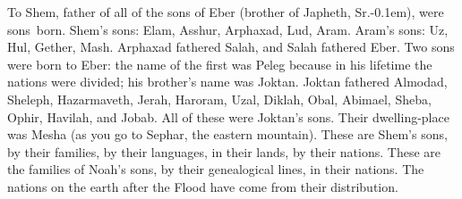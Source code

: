 \begin{inparaenum}
     To Shem, father of all of the sons of Eber (brother of Japheth, Sr.\kern-0.1em), were sons\understood\ born.%
     Shem's sons: Elam, Asshur, Arphaxad, Lud, Aram.%
     Aram's sons: Uz, Hul, Gether, Mash.%
     Arphaxad fathered Salah, and Salah fathered Eber.%
     Two sons were born to Eber: the name of the first was Peleg because in his lifetime the nations were divided; his brother's name was Joktan.%
     Joktan fathered Almodad, Sheleph, Hazarmaveth, Jerah,%
     Haroram, Uzal, Diklah,%
     Obal, Abimael, Sheba,%
     Ophir, Havilah, and Jobab. All of these were Joktan's sons.%
     Their dwelling-place was Mesha (as you go to Sephar, the eastern mountain).%
     These are Shem's sons, by their families, by their languages, in their lands, by their nations.%
     These are the families of Noah's sons, by their genealogical lines, in their nations. The nations on the earth after the Flood have come from their distribution.%
\end{inparaenum}
